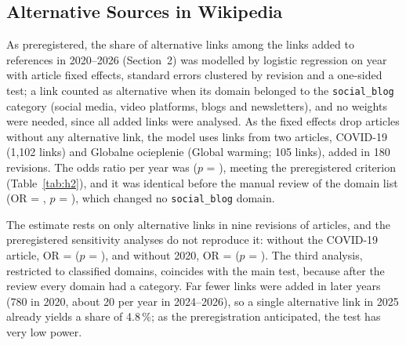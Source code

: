 \documentclass[10pt,a4paper]{article}
\newcommand{\kod}[1]{\texttt{#1}}
\begin{document}
\subsection{Alternative Sources in Wikipedia}
\label{sec:h2}

As preregistered, the share of alternative links among the \resHtwoLinks{} links added to
references in 2020--2026 (Section~2) was modelled by logistic regression on year with
article fixed effects, standard errors clustered by revision and a one-sided test; a link
counted as alternative when its domain belonged to the \kod{social\_blog} category (social
media, video platforms, blogs and newsletters), and no weights were needed, since all added
links were analysed. As the fixed effects drop articles without any alternative link, the
model uses \resHtwoModelLinks{} links from two articles, COVID-19 (1,102 links) and
Globalne ocieplenie (Global warming; 105 links), added in 180 revisions. The odds ratio per
year was \resHtwoOr{} ($p$ = \resHtwoP), meeting the preregistered criterion
(Table~\ref{tab:h2}), and it was identical before the manual review of the domain list
(OR = \resHtwoBeforeReviewOr, $p$ = \resHtwoBeforeReviewP), which changed no
\kod{social\_blog} domain.

The estimate rests on only \resHtwoAlternativeLinks{} alternative links in nine revisions
of \resHtwoAlternativePages{} articles, and the preregistered sensitivity analyses do not
reproduce it: without the COVID-19 article, OR = \resHtwoWithoutCovidOr{}
($p$ = \resHtwoWithoutCovidP), and without 2020, OR = \resHtwoWithoutTwentytwentyOr{}
($p$ = \resHtwoWithoutTwentytwentyP). The third analysis, restricted to classified domains,
coincides with the main test, because after the review every domain had a category.
Far fewer links were added in later years (780 in 2020, about 20 per year in 2024--2026),
so a single alternative link in 2025 already yields a share of 4.8\,\%; as the
preregistration anticipated, the test has very low power.
\end{document}
